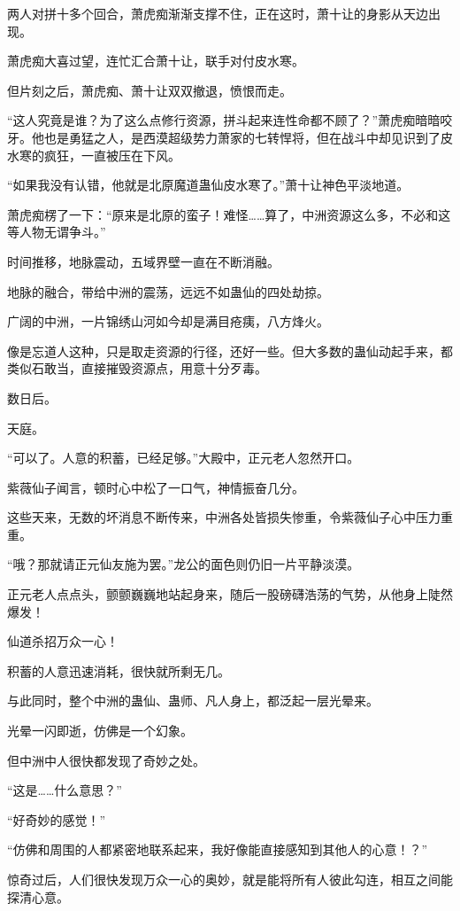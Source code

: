 \begin{this_body}
两人对拼十多个回合，萧虎痴渐渐支撑不住，正在这时，萧十让的身影从天边出现。

萧虎痴大喜过望，连忙汇合萧十让，联手对付皮水寒。

但片刻之后，萧虎痴、萧十让双双撤退，愤恨而走。

“这人究竟是谁？为了这么点修行资源，拼斗起来连性命都不顾了？”萧虎痴暗暗咬牙。他也是勇猛之人，是西漠超级势力萧家的七转悍将，但在战斗中却见识到了皮水寒的疯狂，一直被压在下风。

“如果我没有认错，他就是北原魔道蛊仙皮水寒了。”萧十让神色平淡地道。

萧虎痴楞了一下：“原来是北原的蛮子！难怪……算了，中洲资源这么多，不必和这等人物无谓争斗。”

时间推移，地脉震动，五域界壁一直在不断消融。

地脉的融合，带给中洲的震荡，远远不如蛊仙的四处劫掠。

广阔的中洲，一片锦绣山河如今却是满目疮痍，八方烽火。

像是忘道人这种，只是取走资源的行径，还好一些。但大多数的蛊仙动起手来，都类似石敢当，直接摧毁资源点，用意十分歹毒。

数日后。

天庭。

“可以了。人意的积蓄，已经足够。”大殿中，正元老人忽然开口。

紫薇仙子闻言，顿时心中松了一口气，神情振奋几分。

这些天来，无数的坏消息不断传来，中洲各处皆损失惨重，令紫薇仙子心中压力重重。

“哦？那就请正元仙友施为罢。”龙公的面色则仍旧一片平静淡漠。

正元老人点点头，颤颤巍巍地站起身来，随后一股磅礴浩荡的气势，从他身上陡然爆发！

仙道杀招万众一心！

积蓄的人意迅速消耗，很快就所剩无几。

与此同时，整个中洲的蛊仙、蛊师、凡人身上，都泛起一层光晕来。

光晕一闪即逝，仿佛是一个幻象。

但中洲中人很快都发现了奇妙之处。

“这是……什么意思？”

“好奇妙的感觉！”

“仿佛和周围的人都紧密地联系起来，我好像能直接感知到其他人的心意！？”

惊奇过后，人们很快发现万众一心的奥妙，就是能将所有人彼此勾连，相互之间能探清心意。


\end{this_body}
